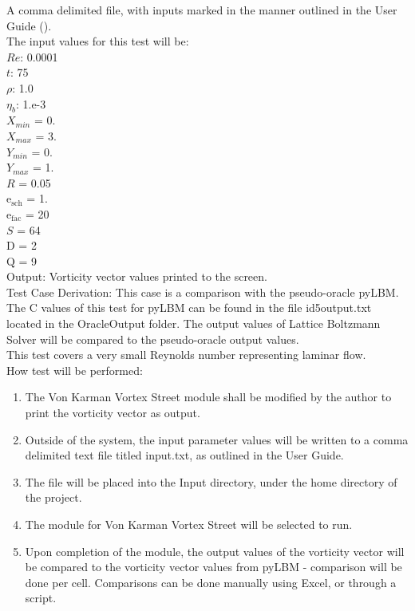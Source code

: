 \documentclass[12pt, titlepage]{article}
\newcommand{\famname}{Lattice Boltzmann Solver}
\begin{document}
\begin{enumerate}
A comma delimited file, with inputs marked in the manner outlined in the User
Guide (\citet{LBM_UserGuide_PM}).\\The input values for this test will be:\\
$Re$: 0.0001\\
$t$: 75\\
$\rho$: 1.0\\
$\eta_b$: 1.e-3\\
$X_{min}$ = 0.\\
$X_{max}$ = 3.\\
$Y_{min}$ = 0.\\
$Y_{max}$ = 1.\\
$R$ = 0.05\\
$\mathrm{e_{sch}}$ = 1.\\
$\mathrm{e_{fac}}$ = 20\\
$S$ = 64\\
$\mathrm{D}$ = 2\\
$\mathrm{Q}$ = 9\\
					
Output: Vorticity vector values printed to the screen.\\

Test Case Derivation: This case is a comparison with the pseudo-oracle
pyLBM. The C values of this test for pyLBM can be found in the file
id5output.txt located in the OracleOutput folder. The output values of {\famname} will be compared to the pseudo-oracle output values.\\

This test covers a very small Reynolds number representing laminar flow.\\

How test will be performed: 

\begin{enumerate}
\item The Von Karman Vortex Street module shall be modified by the author to
  print the vorticity vector as output.
\item Outside of the system, the input parameter values will be written to a
  comma delimited text file titled input.txt, as outlined in the User Guide.
\item The file will be placed into the Input directory, under the home directory
  of the project.
\item The module for Von Karman Vortex Street will be selected to run.
\item Upon completion of the module, the output values of the vorticity vector
  will be compared to the vorticity vector values from pyLBM - comparison will
  be done per cell. Comparisons can be done manually using Excel, or through a
  script.
\end{enumerate}


\end{enumerate}
\end{document}
